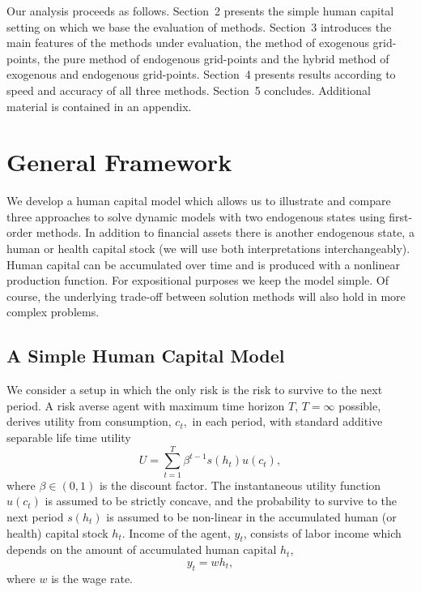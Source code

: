 \documentclass[a4paper,12pt]{article}
\begin{document}
Our analysis proceeds as follows. Section~2 presents the simple human capital setting on which we base the evaluation of methods. Section~3 introduces the main features of the methods under evaluation, the method of exogenous grid-points, the pure method of endogenous grid-points and the hybrid method of exogenous and endogenous grid-points. Section~4 presents results according to speed and accuracy of all three methods. Section~5 concludes. Additional material is contained in an appendix.

\section{General Framework}

We develop a human capital model which allows us to illustrate and compare three approaches to solve dynamic models with two endogenous states using first-order methods. In addition to financial assets there is another endogenous state, a human or health capital stock (we will use both interpretations interchangeably). Human capital can be accumulated over time and is produced with a nonlinear production function. For expositional purposes we keep the model simple. Of course, the underlying trade-off between solution methods will also hold in more complex problems.

\subsection{A Simple Human Capital Model}

\label{ss:simplehkmodel}

We consider a setup in which the only risk is the risk to survive to the next period. A risk averse agent with maximum time horizon $T$, $T=\infty$ possible, derives utility from consumption, $c_{t},$ in each period, with standard additive separable life time utility
\[
	U = \sum_{t=1}^{T} \beta^{t-1} s\left(h_{t}\right) u\left(c_{t}\right),
\]
where $\beta\in\left( 0,1\right)$ is the discount factor. The instantaneous utility function~$u\left( c_{t}\right)$ is assumed to be strictly concave, and the probability to survive to the next period $s\left( h_{t}\right)$ is assumed to be non-linear in the accumulated human (or health) capital stock $h_{t}$. Income of the agent, $y_{t}$, consists of labor income which depends on the amount of accumulated human capital $h_{t}$,
\[
	y_{t} = w h_{t},
\]
where $w$ is the wage rate.
\end{document}
